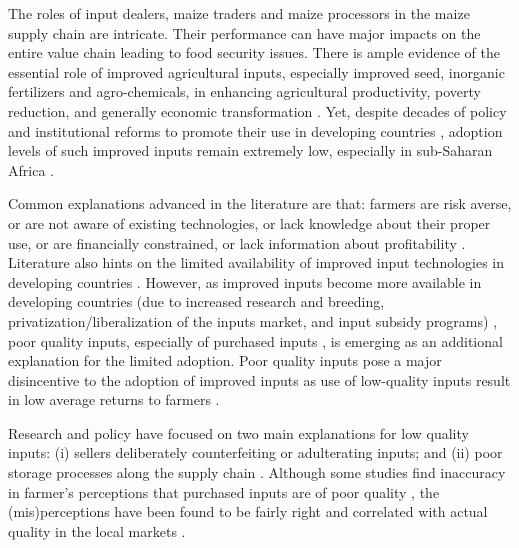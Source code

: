 \documentclass[12pt,english]{article}\usepackage[]{graphicx}\usepackage[]{color}
\begin{document}
\begin{onehalfspace}
The roles of input dealers, maize traders and maize processors in
the maize supply chain are intricate. Their performance can have major
impacts on the entire value chain leading to food security issues.
There is ample evidence of the essential role of improved agricultural
inputs, especially improved seed, inorganic fertilizers and agro-chemicals,
in enhancing agricultural productivity, poverty reduction, and generally
economic transformation \citep{McArthur2017,Zeng2015,Evenson2003}.
Yet, despite decades of policy and institutional reforms to promote
their use in developing countries \citep{Erenstein2018,Swinnen2010,Jayne2013},
adoption levels of such improved inputs remain extremely low, especially
in sub-Saharan Africa \citep{Sheahan2017,Benin2016}. 

Common explanations advanced in the literature are that: farmers are
risk averse, or are not aware of existing technologies, or lack knowledge
about their proper use, or are financially constrained, or lack information
about profitability \citep{Porteous2020,Mbowa2016,Fisher2014,Minten2013}.
Literature also hints on the limited availability of improved input
technologies in developing countries \citep{Asfaw2012,Maredia2000}.
However, as improved inputs become more available in developing countries
(due to increased research and breeding, privatization/liberalization
of the inputs market, and input subsidy programs) \citep{Sheahan2017,Fisher2014,Minten2013,Jayne2013,Jayne2013a},
poor quality inputs, especially of purchased inputs \citep{Ashour2019,Bold2017},
is emerging as an additional explanation for the limited adoption.
Poor quality inputs pose a major disincentive to the adoption of improved
inputs as use of low-quality inputs result in low average returns
to farmers \citep{Bold2015}. 

Research and policy have focused on two main explanations for low
quality inputs: (i) sellers deliberately counterfeiting or adulterating
inputs; and (ii) poor storage processes along the supply chain \citep{Omotilewa2018,Barriga2018}.
Although some studies find inaccuracy in farmer's perceptions that
purchased inputs are of poor quality \citep{Ashour2019,michelson2018misperceived},
the (mis)perceptions have been found to be fairly right and correlated
with actual quality in the local markets \citep{Ashour2019,UrreaHernandez2016}. 


\end{onehalfspace}
\end{document}
